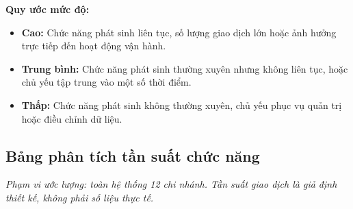 \documentclass[11pt, a4paper]{article}
\begin{document}
\textbf{Quy ước mức độ:}
\begin{itemize}
    \item \textbf{Cao:} Chức năng phát sinh liên tục, số lượng giao dịch lớn hoặc ảnh hưởng trực tiếp đến hoạt động vận hành.
    \item \textbf{Trung bình:} Chức năng phát sinh thường xuyên nhưng không liên tục, hoặc chủ yếu tập trung vào một số thời điểm.
    \item \textbf{Thấp:} Chức năng phát sinh không thường xuyên, chủ yếu phục vụ quản trị hoặc điều chỉnh dữ liệu.
\end{itemize}

\subsection{Bảng phân tích tần suất chức năng}
\textit{Phạm vi ước lượng: toàn hệ thống 12 chi nhánh. Tần suất giao dịch là giả định thiết kế, không phải số liệu thực tế.}
\end{document}
